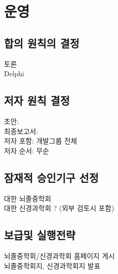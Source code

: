 \documentclass{paper}
\begin{document}
\vspace{30pt}
\section{운영}
\subsection{합의 원칙의 결정}
토론\\
Delphi 

\subsection{저자 원칙 결정}
초안: \\
최종보고서: \\
저자 포함: 개발그룹 전체\\
저자 순서: 무순

\subsection{잠재적 승인기구 선정}
대한 뇌졸중학회\\
대한 신경과학회 ? (외부 검토시 포함)

\subsection{보급및 실행전략}
뇌졸중학회/신경과학회 홈페이지 게시\\
뇌졸중학회지, 신경과학회지 발표
\end{document}
